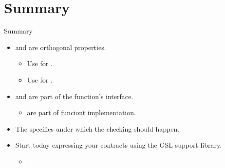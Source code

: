 \section{Summary}

\begin{frame}[t]{Summary}
\begin{itemize}
  \item {} and  are orthogonal properties.
    \begin{itemize}
      \item Use  for .
      \item Use  for .
    \end{itemize}

  \vfill\pause
  \item {} and  are part of the
        function's interface.
    \begin{itemize}
      \item {} are part of funciont implementation.
    \end{itemize}

  \vfill\pause
  \item The  specifies under which 
        the checking should happen.

  \vfill\pause
  \item Start today expressing your contracts using the GSL support library.
    \begin{itemize}
      \item {}.
    \end{itemize}
\end{itemize}
\end{frame}
